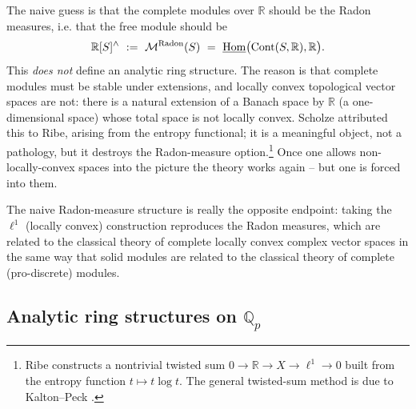 \begin{center}
\end{center}

\begin{remark}
\label{rmk:12:radon-warning}
The naive guess is that the complete modules over $\mathbb{R}$ should be the
Radon measures, i.e. that the free module should be
\begin{equation*}
\mathbb{R}[S]^{\wedge}\ :=\ \MRadon(S)\ =\ \iHom\bigl(\Cont(S,\mathbb{R}),\mathbb{R}\bigr).
\end{equation*}
This \emph{does not} define an analytic ring structure. The reason is that
complete modules must be stable under extensions, and locally convex
topological vector spaces are not: there is a natural extension of a Banach space
by $\mathbb{R}$ (a one-dimensional space) whose total space is not locally convex.
Scholze attributed this to Ribe, arising from the entropy functional; it is a
meaningful object, not a pathology, but it destroys the Radon-measure
option.\footnote{Ribe \cite{Ribe_1979} constructs a nontrivial twisted sum
$0\to\mathbb{R}\to X\to\ell^1\to 0$
built from the entropy function $t\mapsto t\log t$. The general twisted-sum
method is due to Kalton--Peck \cite{Kalton_1979}.}
Once one
allows non-locally-convex spaces into the picture the theory works again -- but
one is forced into them.
\end{remark}

The naive Radon-measure structure is really the opposite endpoint: taking the
$\ell^{1}$ (locally convex) construction reproduces the Radon measures, which are
related to the classical theory of complete locally convex complex vector spaces
in the same way that solid modules are related to the classical theory of
complete (pro-discrete) modules.

\subsection{Analytic ring structures on \texorpdfstring{$\mathbb{Q}_p$}{Qp}}

